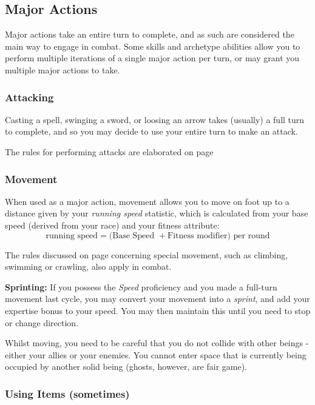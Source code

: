  \subsection{Major Actions}
 
 Major actions take an entire turn to complete, and as such are considered the main way to engage in combat. Some skills and archetype abilities allow you to perform multiple iterations of a single major action per turn, or may grant you multiple major actions to take. 
 
 \subsubsection{Attacking}
 
 Casting a spell, swinging a sword, or loosing an arrow takes (usually) a full turn to complete, and so you may decide to use your entire turn to make an attack.
 
The rules for performing attacks are elaborated on page \pageref{S:Attacks}
 \subsubsection{Movement}
 
 When used as a major action, movement allows you to move on foot up to a distance given by your {\it running speed} statistic, which is calculated from your base speed (derived from your race) and your fitness attribute:
\small
$$ \text{running speed} = \big(\text{Base Speed } + \text{Fitness modifier}\big) \text{ per round} $$  
\normalsize

The rules discussed on page \pageref{S:SpecialMovement} concerning special movement, such as climbing, swimming or crawling, also apply in combat. 

{\bf Sprinting:} If you possess the {\it Speed} proficiency and you made a full-turn movement last cycle, you may convert your movement into a {\it sprint}, and add your expertise bonus to your speed. You may then maintain this until you need to stop or change direction. 

Whilst moving, you need to be careful that you do not collide with other beings - either your allies or your enemies. You cannot enter space that is currently being occupied by another solid being (ghosts, however, are fair game). 

 \subsubsection{Using Items (sometimes)}
 
